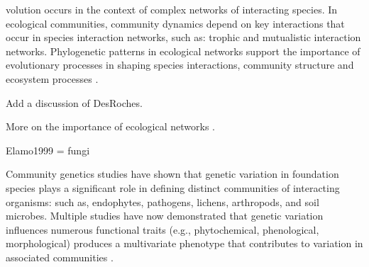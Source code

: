 \documentclass[9pt,twocolumn,twoside,lineno]{pnas-new}
\begin{document}


\maketitle
\thispagestyle{firststyle}




volution occurs in the context of complex networks of
interacting species. In ecological communities, community dynamics
depend on key interactions \cite{Fontaine2011} that occur in species
interaction networks, such as:  trophic \cite{Bascompte2006,
  Johnson2008, Johnson2009} and mutualistic \cite{Rafferty2013}
interaction networks. Phylogenetic patterns in ecological networks
support the importance of evolutionary processes in shaping species
interactions, community structure and ecosystem processes
\cite{Crutsinger2016, Rezende2007, Whitham2006a}.

Add a discussion of DesRoches.

More on the importance of ecological networks \cite{Guimaraes2011,
  Moya-Larano2011, Thompson2013a}.

Elamo1999 = fungi

Community genetics studies \cite{Lamit2015a} have shown that
genetic variation in foundation species \cite{Ellison2005} plays a
significant role in defining distinct communities of interacting
organisms:  such as, endophytes, pathogens, lichens, arthropods, and
soil microbes. Multiple studies have now demonstrated that genetic
variation influences numerous functional traits (e.g., phytochemical,
phenological, morphological) produces a multivariate phenotype
\cite{holeski2012} that contributes to variation in associated
communities \cite{Bailey2009a}.
\end{document}
